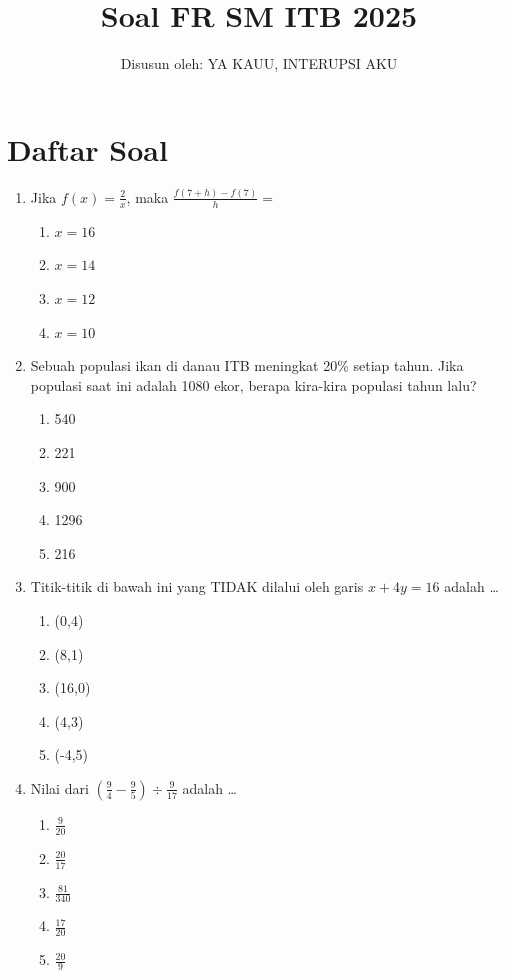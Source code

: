 \documentclass[12pt]{article}
\title{Soal FR SM ITB 2025}
\author{Disusun oleh: YA KAUU, INTERUPSI AKU}
\date{}
\begin{document}
\maketitle

\section*{Daftar Soal}

\begin{enumerate}[label=\textbf{\arabic*.}]

\item Jika $f(x)=\frac{2}{x}$, maka $\frac{f(7+h)-f(7)}{h}=$
\begin{enumerate}[label=\alph*.]
    \item $x = 16$
    \item $x = 14$
    \item $x = 12$
    \item $x = 10$
\end{enumerate}

\item Sebuah populasi ikan di danau ITB meningkat 20\% setiap tahun. Jika populasi saat ini adalah 1080 ekor, berapa kira-kira populasi tahun lalu?
\begin{enumerate}[label=\alph*.]
    \item 540
    \item 221
    \item 900
    \item 1296
    \item 216
\end{enumerate}

\item Titik-titik di bawah ini yang TIDAK dilalui oleh garis $x+4y = 16$ adalah \dots
\begin{enumerate}[label=\alph*.]
    \item (0,4)
    \item (8,1)
    \item (16,0)
    \item (4,3)
    \item (-4,5)
\end{enumerate}

\item Nilai dari $(\frac{9}{4}-\frac{9}{5})\div\frac{9}{17}$ adalah \dots
\begin{enumerate}[label=\alph*.]
    \item $\frac{9}{20}$
    \item $\frac{20}{17}$
    \item $\frac{81}{340}$
    \item $\frac{17}{20}$
    \item $\frac{20}{9}$ 
\end{enumerate}


\end{enumerate}
\end{document}
